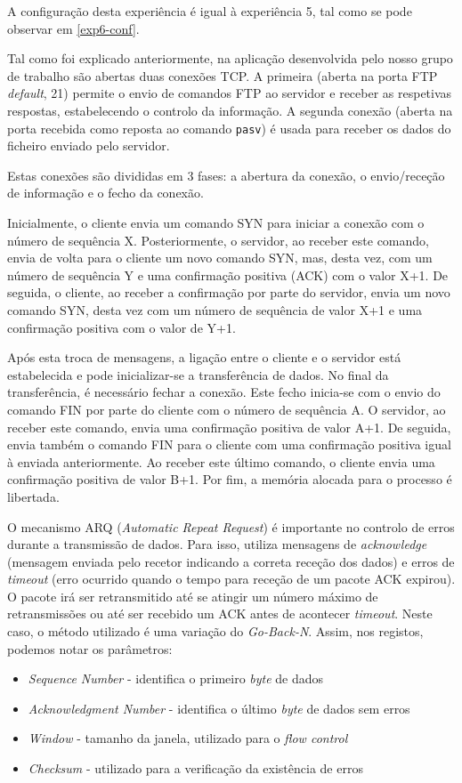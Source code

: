 \documentclass[article, a4paper, 11pt, oneside]{memoir}
\begin{document}
A configuração desta experiência é igual à experiência 5, tal como se pode observar em
\ref{exp6-conf}.

Tal como foi explicado anteriormente, na aplicação desenvolvida pelo nosso grupo de trabalho são
abertas duas conexões TCP.
A primeira (aberta na porta FTP \textit{default}, 21) permite o envio de comandos FTP
ao servidor e receber as respetivas respostas, estabelecendo o controlo da informação.
A segunda conexão (aberta na porta recebida como reposta ao comando \verb|pasv|)
é usada para receber os dados do ficheiro enviado pelo servidor. 

Estas conexões são divididas em 3 fases: a abertura da conexão, o envio/receção de informação 
e o fecho da conexão. 

Inicialmente, o cliente envia um comando SYN para iniciar a conexão com o número de sequência X.
Posteriormente, o servidor, ao receber este comando, envia de volta para o cliente um novo comando SYN,
mas, desta vez, com um número de sequência Y e uma confirmação positiva (ACK) com o valor X+1.
De seguida, o cliente, ao receber a confirmação por parte do servidor, envia um novo comando SYN,
desta vez com um número de sequência de valor X+1 e uma confirmação positiva com o valor de Y+1.

Após esta troca de mensagens, a ligação entre o cliente e o servidor está estabelecida e pode
inicializar-se a transferência de dados. No final da transferência, é necessário fechar a conexão.
Este fecho inicia-se com o envio do comando FIN por parte do cliente com o número de sequência A.
O servidor, ao receber este comando, envia uma confirmação positiva de valor A+1. De seguida,
envia também o comando FIN para o cliente com uma confirmação positiva igual à enviada anteriormente.
Ao receber este último comando, o cliente envia uma confirmação positiva de valor B+1.
Por fim, a memória alocada para o processo é libertada. 

O mecanismo ARQ (\textit{Automatic Repeat Request}) é importante no controlo de erros durante a
transmissão de dados. Para isso, utiliza mensagens de \textit{acknowledge}
(mensagem enviada pelo recetor indicando a correta receção dos dados) e erros de \textit{timeout}
(erro ocurrido quando o tempo para receção de um pacote ACK expirou). O pacote irá ser
retransmitido até se atingir um número máximo de retransmissões ou até ser recebido um ACK
antes de acontecer \textit{timeout}. Neste caso, o método utilizado é uma variação do
\textit{Go-Back-N}. Assim, nos registos, podemos notar os parâmetros:
\begin{itemize}
  \item \textit{Sequence Number} - identifica o primeiro \textit{byte} de dados
  \item \textit{Acknowledgment Number} - identifica o último \textit{byte} de dados sem erros
  \item \textit{Window} - tamanho da janela, utilizado para o \textit{flow control}
  \item \textit{Checksum} - utilizado para a verificação da existência de erros
\end{itemize}
\end{document}
